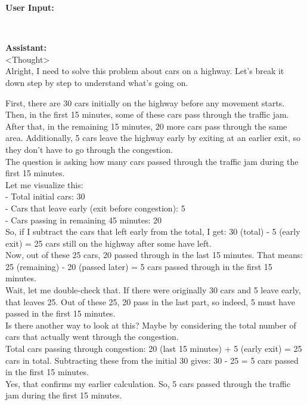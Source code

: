 \begin{abox} 
\textbf{User Input:}  \\

\ 

\textbf{Assistant:}\\
<Thought>\\
Alright, I need to solve this problem about cars on a highway. Let's break it down step by step to understand what's 
going on.\\
\end{abox}
\begin{abox}
First, there are 30 cars initially on the highway before any movement starts. Then, in the first 15 minutes, some of 
these cars pass through the traffic jam. After that, in the remaining 15 minutes, 20 more cars pass through the same 
area. Additionally, 5 cars leave the highway early by exiting at an earlier exit, so they don't have to go through 
the congestion.\\

The question is asking how many cars passed through the traffic jam during the first 15 minutes.\\

Let me visualize this:\\

- Total initial cars: 30\\
- Cars that leave early (exit before congestion): 5\\
- Cars passing in remaining 45 minutes: 20\\

So, if I subtract the cars that left early from the total, I get:
30 (total) - 5 (early exit) = 25 cars still on the highway after some have left.\\

Now, out of these 25 cars, 20 passed through in the last 15 minutes. That means:
25 (remaining) - 20 (passed later) = 5 cars passed through in the first 15 minutes.\\

Wait, let me double-check that. If there were originally 30 cars and 5 leave early, that leaves 25. Out of these 25, 
20 pass in the last part, so indeed, 5 must have passed in the first 15 minutes.\\

Is there another way to look at this? Maybe by considering the total number of cars that actually went through the congestion.\\

Total cars passing through congestion: 20 (last 15 minutes) + 5 (early exit) = 25 cars in total.
Subtracting these from the initial 30 gives:
30 - 25 = 5 cars passed in the first 15 minutes.\\

Yes, that confirms my earlier calculation. So, 5 cars passed through the traffic jam during the first 15 minutes.\\

\end{abox}

